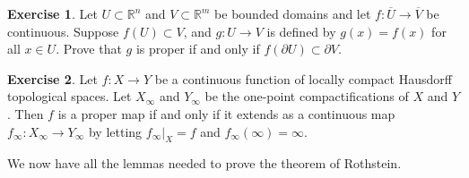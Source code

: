 \documentclass[12pt,openany]{book}
\newcommand{\R}{{\mathbb{R}}}
\theoremstyle{plain}
\theoremstyle{remark}
\theoremstyle{definition}
\newenvironment{exbox}{%
    \def\FrameCommand{\vrule width 1pt \relax\hspace {10pt}}%
    \MakeFramed {\advance \hsize -\width \FrameRestore }%
}{%
    \endMakeFramed
}
\theoremstyle{exercise}
\newtheorem{exercise}{Exercise}[section]
\theoremstyle{example}
\begin{document}
\begin{exbox}
\begin{exercise}
Let $U \subset \R^n$ and $V \subset \R^m$ be bounded domains and
let $f \colon \overline{U} \to \overline{V}$ be continuous.
Suppose $f(U) \subset V$, and $g \colon U \to V$ is defined by
$g(x) = f(x)$ for all $x \in U$.
Prove that $g$ is proper if and only if $f(\partial U) \subset \partial V$.
\end{exercise}

\begin{exercise}
Let $f \colon X \to Y$ be a continuous function of locally compact Hausdorff topological spaces.
Let $X_\infty$ and $Y_\infty$ be the 
one-point compactifications of $X$ and $Y$.
Then $f$ is a proper map if and only if it extends as a continuous map
$f_\infty \colon X_\infty \to Y_\infty$ by letting
$f_\infty |_X = f$ and
 $f_\infty(\infty) = \infty$.
\end{exercise}
\end{exbox}

We now have all the lemmas needed to prove the theorem of Rothstein.
\end{document}
